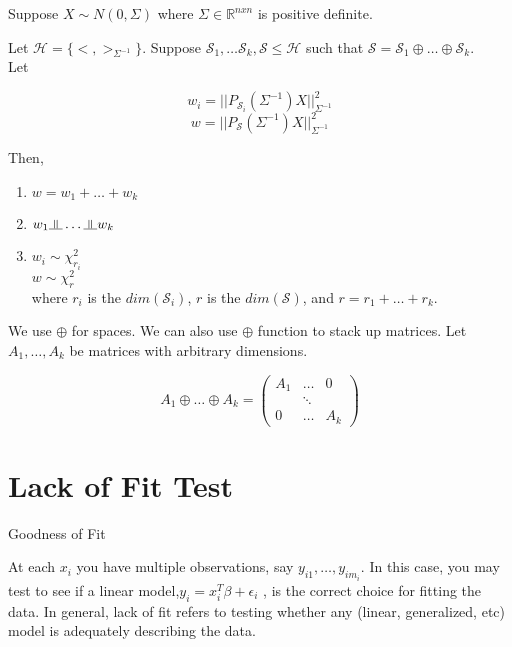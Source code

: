\documentclass[11pt,fleqn]{book} %
\newcommand{\indep}{\rotatebox[origin=c]{90}{$\models$}}
\begin{document}
\begin{theorem}

Suppose $X \sim N(0, \Sigma)$ where $\Sigma \in \mathbb{R}^{nxn}$ is positive definite. 

Let $\mathscr{H} = \{ <,>_{\Sigma^{-1}}\}$. Suppose $\mathscr{S}_1, \dots \mathscr{S}_k, \mathscr{S} \leq \mathscr{H}$ such that $\mathscr{S} = \mathscr{S}_1 \oplus \dots \oplus \mathscr{S}_k$.\\

Let 

	$$w_i = ||P_{\mathscr{S}_i} (\Sigma^{-1}) X ||^2_{\Sigma^{-1}} $$
	$$w = ||P_{\mathscr{S}} (\Sigma^{-1}) X ||^2_{\Sigma^{-1}} $$

Then, 

\begin{enumerate}
	\item $ w = w_1 + \dots + w_k$
	\item $ w_1 \indep \dots \indep w_k$
	\item $w_i \sim \chi^2_{r_i}$\\
		$w \sim \chi^2_{r}$\\
		where $r_i$ is the $dim(\mathscr{S}_i)$, $r$ is the $dim(\mathscr{S})$, and $r = r_1 + \dots + r_k$.
\end{enumerate}
	
\end{theorem}

\begin{notation}
	We use $\oplus$ for spaces. We can also use $\oplus$ function to stack up matrices. Let $A_1, \dots, A_k$ be matrices with arbitrary dimensions. 

	$$A_1 \oplus \dots \oplus A_k = \begin{pmatrix}
		A_1 & \dots & 0\\
		    & \ddots & \\
		0 & \dots & A_k
	\end{pmatrix} $$
\end{notation}

\section{Lack of Fit Test}

Goodness of Fit


At each $x_i$ you have multiple observations, say $y_{i1}, \dots, y_{im_i}$. In this case, you may test to see if a linear model,$y_i = x_i^T \beta + \epsilon_i$ , is the correct choice for fitting the data. In general, lack of fit refers to testing whether any (linear, generalized, etc) model is adequately describing the data. 
\end{document}
